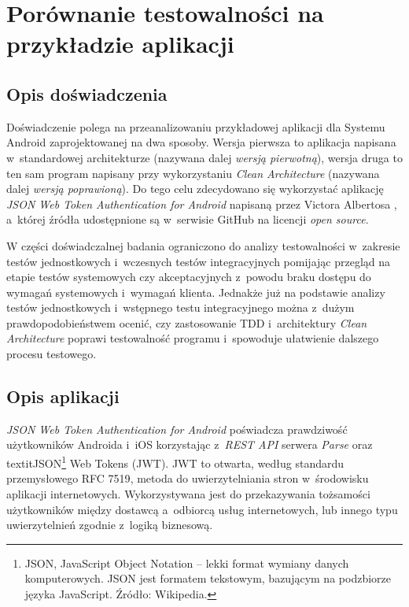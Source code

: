 \chapter{Porównanie testowalności \newline na przykładzie aplikacji}
\label{analiza_testow}

\section{Opis doświadczenia}
Doświadczenie polega na przeanalizowaniu przykładowej aplikacji dla Systemu Android zaprojektowanej na dwa sposoby. Wersja pierwsza to aplikacja napisana w~standardowej architekturze (nazywana dalej \textit{wersją pierwotną}), wersja druga to ten sam program napisany przy wykorzystaniu \textit{Clean Architecture} (nazywana dalej \textit{wersją poprawioną}). Do tego celu zdecydowano się wykorzystać
aplikację \textit{JSON Web Token Authentication for Android} napisaną przez Victora Albertosa \cite{website:victor:aplication} , a~której źródła udostępnione są w~serwisie GitHub na licencji \textit{open source}.

W części doświadczalnej badania ograniczono do analizy testowalności w~zakresie testów jednostkowych i~wczesnych testów integracyjnych pomijając przegląd na etapie testów systemowych czy akceptacyjnych z~powodu braku dostępu do wymagań systemowych i~wymagań klienta. Jednakże już na podstawie analizy testów jednostkowych i~wstępnego testu integracyjnego można z~dużym prawdopodobieństwem ocenić, czy zastosowanie TDD i~architektury \textit{Clean Architecture} poprawi testowalność programu i~spowoduje ułatwienie dalszego procesu testowego.

\section{Opis aplikacji}
\textit{JSON Web Token Authentication for Android} poświadcza prawdziwość użytkowników Androida i~iOS korzystając z~\textit{REST API} serwera \textit{Parse} oraz textit{JSON\footnote{JSON, JavaScript Object Notation – lekki format wymiany danych komputerowych. JSON jest formatem tekstowym, bazującym na podzbiorze języka JavaScript. Źródło: Wikipedia.} Web Tokens (JWT)}. JWT to otwarta, według standardu przemysłowego RFC 7519\cite{website:jwt:rfc7519}, metoda do uwierzytelniania stron w~środowisku aplikacji internetowych. Wykorzystywana jest do przekazywania tożsamości użytkowników między dostawcą a~odbiorcą usług internetowych, lub innego typu uwierzytelnień zgodnie z~logiką biznesową. 

